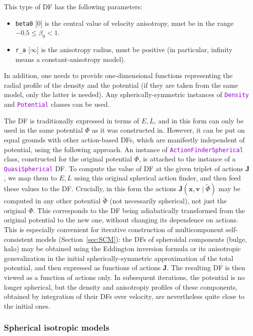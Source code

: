 \documentclass[12pt]{article}
\newcommand{\ttt}[1]{\textcolor{darkviolet}{\texttt{#1}}}
\newcommand{\ppp}[1]{\textcolor{darkolive} {\texttt{#1}}}
\newcommand{\bv}{\boldsymbol{v}}
\newcommand{\bx}{\boldsymbol{x}}
\newcommand{\bJ}{\boldsymbol{J}}
\begin{document}
This type of DF has the following parameters:
\begin{itemize}
\item \ppp{beta0} [0]  is the central value of velocity anisotropy, must be in the range $-0.5 \le \beta_0 < 1$.
\item \ppp{r_a} [$\infty$]  is the anisotropy radius, must be positive (in particular, infinity means a constant-anisotropy model).
\end{itemize}
In addition, one needs to provide one-dimensional functions representing the radial profile of the density and the potential (if they are taken from the same model, only the latter is needed). Any spherically-symmetric instances of \ttt{Density} and \ttt{Potential} classes can be used.

The DF is traditionally expressed in terms of $E,L$, and in this form can only be used in the same potential $\Phi$ as it was constructed in. However, it can be put on equal grounds with other action-based DFs, which are manifestly independent of potential, using the following approach.
An instance of \ttt{ActionFinderSpherical} class, constructed for the original potential $\Phi$, is attached to the instance of a \ttt{QuasiSpherical} DF. To compute the value of DF at the given triplet of actions $\bJ$, we map them to $E,L$ using this original spherical action finder, and then feed these values to the DF. Crucially, in this form the actions $\bJ(\bx,\bv \;|\;\tilde\Phi)$ may be computed in any other potential $\tilde\Phi$ (not necessarily spherical), not just the original $\Phi$. This corresponds to the DF being adiabatically transformed from the original potential to the new one, without changing its dependence on actions.
This is especially convenient for iterative construction of multicomponent self-consistent models (Section~\ref{sec:SCM}): the DFs of spheroidal components (bulge, halo) may be obtained using the Eddington inversion formula or its anisotropic generalization in the initial spherically-symmetric approximation of the total potential, and then expressed as functions of actions $\bJ$. The resulting DF is then viewed as a function of actions only. In subsequent iterations, the potential is no longer spherical, but the density and anisotropiy profiles of these components, obtained by integration of their DFs over velocity, are nevertheless quite close to the initial ones.


\subsubsection{Spherical isotropic models}  \label{sec:DFsphericalIsotropic}
\end{document}
